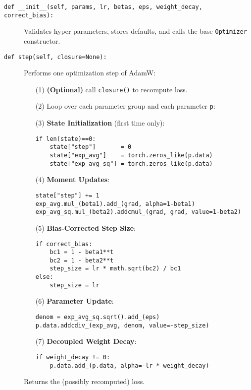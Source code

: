 \documentclass{article}
\theoremstyle{definition}
\begin{document}
\begin{description}

  \item[\texttt{def \_\_init\_\_(self, params, lr, betas, eps, weight\_decay, correct\_bias):}]  
    Validates hyper‐parameters, stores defaults, and calls the base \texttt{Optimizer} constructor.


  \item[\texttt{def step(self, closure=None):}]  
    Performs one optimization step of AdamW:
    \begin{enumerate}
      \item[(1)] \textbf{(Optional)} call \texttt{closure()} to recompute loss.
      \item[(2)] Loop over each parameter group and each parameter \texttt{p}:
      \item[(3)] \textbf{State Initialization} (first time only):
\begin{verbatim}
if len(state)==0:
    state["step"]       = 0
    state["exp_avg"]    = torch.zeros_like(p.data)
    state["exp_avg_sq"] = torch.zeros_like(p.data)
\end{verbatim}
      \item[(4)] \textbf{Moment Updates}:
\begin{verbatim}
state["step"] += 1
exp_avg.mul_(beta1).add_(grad, alpha=1-beta1)
exp_avg_sq.mul_(beta2).addcmul_(grad, grad, value=1-beta2)
\end{verbatim}
      \item[(5)] \textbf{Bias‐Corrected Step Size}:
\begin{verbatim}
if correct_bias:
    bc1 = 1 - beta1**t
    bc2 = 1 - beta2**t
    step_size = lr * math.sqrt(bc2) / bc1
else:
    step_size = lr
\end{verbatim}
      \item[(6)] \textbf{Parameter Update}:
\begin{verbatim}
denom = exp_avg_sq.sqrt().add_(eps)
p.data.addcdiv_(exp_avg, denom, value=-step_size)
\end{verbatim}
      \item[(7)] \textbf{Decoupled Weight Decay}:
\begin{verbatim}
if weight_decay != 0:
    p.data.add_(p.data, alpha=-lr * weight_decay)
\end{verbatim}
    \end{enumerate}
    Returns the (possibly recomputed) loss.
\end{description}


\end{document}
